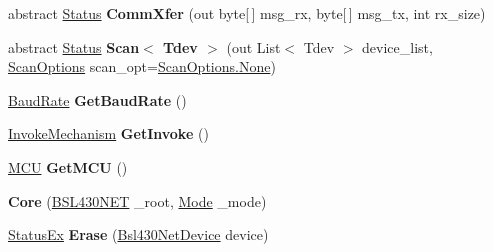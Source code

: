 \begin{DoxyCompactItemize}
abstract \mbox{\hyperlink{class_b_s_l430___n_e_t_1_1_status}{Status}} {\bfseries Comm\+Xfer} (out byte\mbox{[}$\,$\mbox{]} msg\+\_\+rx, byte\mbox{[}$\,$\mbox{]} msg\+\_\+tx, int rx\+\_\+size)
\item 
\mbox{\label{class_b_s_l430___n_e_t_1_1_main_1_1_core_a349e409bab544a7f8b46ac5be49d9964}} 
abstract \mbox{\hyperlink{class_b_s_l430___n_e_t_1_1_status}{Status}} {\bfseries Scan$<$ Tdev $>$} (out List$<$ Tdev $>$ device\+\_\+list, \mbox{\hyperlink{namespace_b_s_l430___n_e_t_a4cd6f8166a2a97ccb3405df2287d4ba8}{Scan\+Options}} scan\+\_\+opt=\mbox{\hyperlink{namespace_b_s_l430___n_e_t_a4cd6f8166a2a97ccb3405df2287d4ba8a6adf97f83acf6453d4a6a4b1070f3754}{Scan\+Options.\+None}})
\item 
\mbox{\label{class_b_s_l430___n_e_t_1_1_main_1_1_core_ada0371802ddfa84f4ee9588e9a2412a4}} 
\mbox{\hyperlink{namespace_b_s_l430___n_e_t_a8d30c263598635a481840944d38aeb70}{Baud\+Rate}} {\bfseries Get\+Baud\+Rate} ()
\item 
\mbox{\label{class_b_s_l430___n_e_t_1_1_main_1_1_core_a58b7dc9e778c336926378d91f823f73c}} 
\mbox{\hyperlink{namespace_b_s_l430___n_e_t_a6571fdf0fbbc8408b8428f4d642c1305}{Invoke\+Mechanism}} {\bfseries Get\+Invoke} ()
\item 
\mbox{\label{class_b_s_l430___n_e_t_1_1_main_1_1_core_a92fa9aa32d47c2268869a6906e08fb87}} 
\mbox{\hyperlink{namespace_b_s_l430___n_e_t_a2cdaa65be7e1679fc8ca77610b19a490}{M\+CU}} {\bfseries Get\+M\+CU} ()
\item 
\mbox{\label{class_b_s_l430___n_e_t_1_1_main_1_1_core_a8dd6bc32c3567a6b870c753f87ec0d19}} 
{\bfseries Core} (\mbox{\hyperlink{class_b_s_l430___n_e_t_1_1_b_s_l430_n_e_t}{B\+S\+L430\+N\+ET}} \+\_\+root, \mbox{\hyperlink{namespace_b_s_l430___n_e_t_aa1c6981cb6f279b5491d861ca555a1d7}{Mode}} \+\_\+mode)
\item 
\mbox{\label{class_b_s_l430___n_e_t_1_1_main_1_1_core_afbf6a6469c4c502fdd50f30e2430cb16}} 
\mbox{\hyperlink{class_b_s_l430___n_e_t_1_1_status_ex}{Status\+Ex}} {\bfseries Erase} (\mbox{\hyperlink{class_b_s_l430___n_e_t_1_1_bsl430_net_device}{Bsl430\+Net\+Device}} device)

\end{DoxyCompactItemize}
